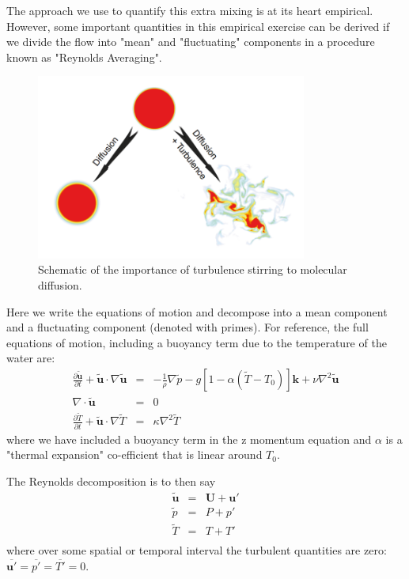 \documentclass[11pt]{article}
\begin{document}
The approach we use to quantify this extra mixing is at its heart empirical. 
However, some important quantities in this empirical exercise can be derived if
we divide the flow into "mean" and "fluctuating" components in a procedure
known as "Reynolds Averaging".  

\begin{figure}[hbtp]
  \begin{center}
    \includegraphics[width=3.5in]{images/SmythMoum01Schematic}
    \caption{Schematic of the importance of turbulence stirring to molecular
diffusion. }   
    \label{fig:SmythMoum01Schematic}
  \end{center}
\end{figure}

Here we write the equations of motion and decompose into a mean component and a
fluctuating component (denoted with primes).  For reference, the full equations
of motion, including a buoyancy term due to the temperature of the water are:
 \begin{eqnarray*}
     \frac{\partial \mathbf{\tilde{u}}}{\partial t} + \mathbf{\tilde{u}}\cdot
\nabla \mathbf{\tilde{u}} & = & -\frac{1}{\rho} \nabla \tilde{p} - g \left[  1
- \alpha(\tilde{T}-T_0)\right]\mathbf{k} + \nu \nabla^2 \mathbf{\tilde{u}}\\
     \nabla\cdot\mathbf{\tilde{u}} & = & 0\\
     \frac{\partial \tilde{T}}{\partial t} + \mathbf{\tilde{u}}\cdot\nabla
\tilde{T} & = & \kappa \nabla^2 \tilde{T}
 \end{eqnarray*}
where we have included a buoyancy term in the z momentum equation and $\alpha$
is a "thermal expansion" co-efficient that is linear around $T_0$.  

The Reynolds decomposition is to then say
\begin{eqnarray*}
    \mathbf{\tilde{u}} & = & \mathbf{U} + \mathbf{u'}\\
    \tilde{p} & = & P + p'\\
    \tilde{T} & = & T + T'\\
\end{eqnarray*}
where over some spatial or temporal interval the turbulent quantities are zero:
$\overline{\mathbf{u'}} = \overline{p'} = \overline{T'} = 0$.  
\end{document}
